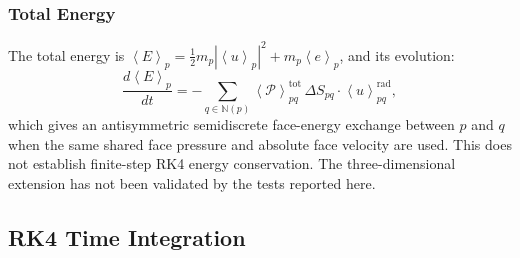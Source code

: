 \documentclass[twocolumn]{aastex63}
\newcommand{\vel}{{u}}
\newcommand{\surf}[0]{S}
\newcommand{\pressure}[0]{\mathcal{P}}
\begin{document}
\subsubsection{Total Energy}

The total energy is
$\left<E\right>_p = \tfrac{1}{2}m_p|\left<\vel\right>_p|^2
  + m_p\left<e\right>_p$, and its evolution:
\begin{equation}\label{eq:etot3d}
  \frac{d\left<E\right>_p}{dt}
  = -\sum_{q\in\mathbb{N}(p)}
    \left<\pressure\right>_{pq}^\textrm{tot}
    \,\Delta\surf_{pq}\cdot
    \left<\vel\right>_{pq}^\textrm{rad},
\end{equation}
which gives an antisymmetric semidiscrete face-energy exchange between $p$
and $q$ when the same shared face pressure and absolute face velocity are
used. This does not establish finite-step RK4 energy conservation. The
three-dimensional extension has not been validated by the tests reported
here.


\subsection{RK4 Time Integration}
\end{document}
